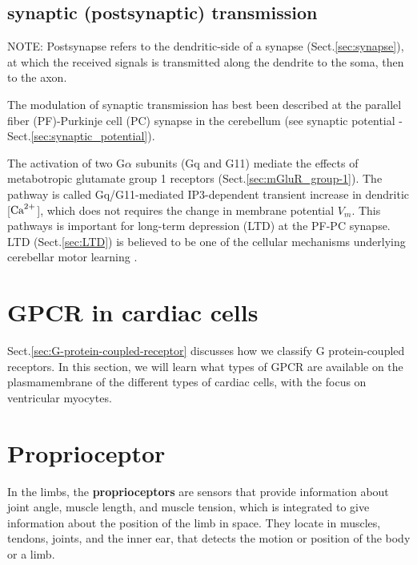 \subsection{synaptic (postsynaptic) transmission}
\label{sec:synaptic_transmission}
\label{sec:postsynaptic_transmission}

NOTE: Postsynapse refers to the dendritic-side of a synapse
(Sect.\ref{sec:synapse}), at which the received signals is transmitted along the
dendrite to the soma, then to the axon.

The modulation of synaptic transmission has best been described at the parallel
fiber (PF)-Purkinje cell (PC) synapse in the cerebellum (see synaptic potential
- Sect.\ref{sec:synaptic_potential}).

The activation of two G$\alpha$ subunits (Gq and G11) mediate the effects of
metabotropic glutamate group 1 receptors (Sect.\ref{sec:mGluR_group-1}). The
pathway is called Gq/G11-mediated IP3-dependent transient increase in dendritic
[${\text{Ca}^{2+}}$], which does not requires the change in membrane potential $V_m$. This
pathways is important for long-term depression (LTD) at the PF-PC synapse.
LTD (Sect.\ref{sec:LTD}) is believed to be one of the cellular mechanisms
underlying cerebellar motor learning \citep{fino2010}.



\section{GPCR in cardiac cells}

Sect.\ref{sec:G-protein-coupled-receptor} discusses how we classify G
protein-coupled receptors. In this section, we will learn what types of GPCR are
available on the plasmamembrane of the different types of cardiac cells, with
the focus on ventricular myocytes.

\citep{Wettschureck2005}

\section{Proprioceptor}
\label{sec:proprioceptor}

In the limbs, the {\bf proprioceptors} are sensors that provide information
about joint angle, muscle length, and muscle tension, which is integrated to
give information about the position of the limb in space.
They locate in muscles, tendons, joints, and the inner ear, that detects the
motion or position of the body or a limb.


